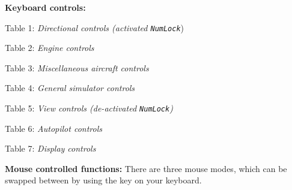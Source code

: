 \documentclass[10pt]{article}
\begin{document}
 \noindent
 \textbf{Keyboard controls:}
\begin{multicols}{2}
 \noindent
Table 1: \textit{Directional controls (activated \texttt{NumLock}})\\

\noindent

\bigskip

 \noindent
Table 2: \textit{Engine controls}
\medskip

 \noindent

\medskip

 \noindent
Table 3: \textit{Miscellaneous aircraft controls}
\medskip

 \noindent

\bigskip


 \noindent
Table 4: \textit{General simulator controls}
\medskip

 \noindent

\medskip

\noindent
Table 5: \textit{View controls (de-activated \texttt{NumLock})}
\medskip

 \noindent
 
\medskip


\medskip

 \noindent
 Table 6: \textit{Autopilot controls}
\medskip

\noindent

\medskip

 \noindent
 Table 7: \textit{Display controls}
\medskip

 \noindent

\bigskip

\end{multicols}

 \noindent
 \textbf{Mouse controlled functions:}
 There are three mouse modes, which can be swapped between by using the  key on your keyboard.
\end{document}
